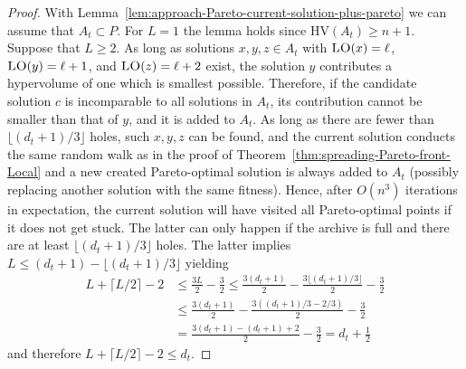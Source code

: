 \documentclass[
sigconf = false, %
review = false, %
screen = true, %
anonymous = true, %
format=acmsmall
]{acmart}
\newcommand{\hv}{\ensuremath{\mathrm{HV}}\xspace}
\newcommand{\LO}{\textsc{LO}\xspace}                      %
\begin{document}
\begin{proof}
With Lemma~\ref{lem:approach-Pareto-current-solution-plus-pareto} we can assume that $A_t \subset P$. For $L=1$ the lemma holds since $\hv(A_t) \geq n+1$. Suppose that $L \geq 2$. As long as solutions $x,y,z \in A_t$ with $\LO(x)=\ell$, $\LO(y)=\ell+1$, and $\LO(z)=\ell+2$ exist, the solution $y$ contributes a hypervolume of one which is smallest possible. Therefore, if the candidate solution $c$ is incomparable to all solutions in $A_t$, its contribution cannot be smaller than that of $y$, and it is added to $A_t$. As long as there are fewer than $\lfloor{(d_t+1)/3}\rfloor$ holes, such $x,y,z$ can be found, and the current solution conducts the same random walk as in the proof of Theorem~\ref{thm:spreading-Pareto-front-Local} and a new created Pareto-optimal solution is always added to $A_t$ (possibly replacing another solution with the same fitness). Hence, after $O(n^3)$ iterations in expectation, the current solution will have visited all Pareto-optimal points if it does not get stuck. The latter can only happen if the archive is full and there are at least $\lfloor{(d_t+1)/3}\rfloor$ holes. The latter implies $L \leq (d_t+1) - \lfloor{(d_t+1)/3}\rfloor$ yielding
\begin{align*}
L +\lceil{L/2}\rceil-2 &\leq \frac{3L}{2}-\frac{3}{2} \leq \frac{3(d_t+1)}{2} - \frac{3\lfloor{(d_t+1)/3}\rfloor}{2}-\frac{3}{2} \\
& \leq \frac{3(d_t+1)}{2} - \frac{3((d_t+1)/3-2/3)}{2}- \frac{3}{2} \\
&= \frac{3(d_t+1)-(d_t+1)+2}{2} - \frac{3}{2} = d_t+\frac{1}{2}
\end{align*}
and therefore $L +\lceil{L/2}\rceil-2 \leq d_t$. 


\end{proof}
\end{document}
